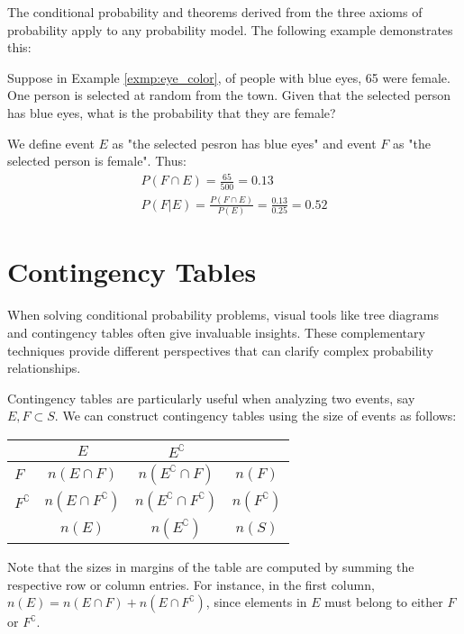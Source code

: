 The conditional probability and theorems derived from the three axioms of probability apply to any probability model.
The following example demonstrates this:

\begin{exmp}
	Suppose in Example \autoref{exmp:eye_color}, of people with blue eyes, 65 were female.
	One person is selected at random from the town.
	Given that the selected person has blue eyes, what is the probability that they are female?
\end{exmp}
\begin{solution}
	We define event \( E \) as "the selected pesron has blue eyes" and event \( F \) as "the selected person is female".
	Thus:
	\begin{gather*}
		P(F \cap E) = \frac{65}{500} = 0.13\\
		P(F | E) = \frac{P(F \cap E)}{P(E)} = \frac{0.13}{0.25} = 0.52
	\end{gather*}
\end{solution}

\section{Contingency Tables}

When solving conditional probability problems, visual tools like tree diagrams and contingency tables often give invaluable insights.
These complementary techniques provide different perspectives that can clarify complex probability relationships.

Contingency tables are particularly useful when analyzing two events, say \( E, F \subset S \).
We can construct contingency tables using the size of events as follows:
\begin{center}
\begin{tabular}{l|cc|c}
                       & \( E \) & \( E^\complement \) &  \\ \hline
\( F \)                & \( n(E \cap F) \) & \( n(E^\complement \cap F) \) & \( n(F) \) \\ 
\( F^\complement \)    & \( n(E \cap F^\complement) \) & \( n(E^\complement \cap F^\complement) \) & \( n(F^\complement) \) \\ \hline
                       & \( n(E) \) & \( n(E^\complement) \) & \( n(S) \)
\end{tabular}
\end{center}
Note that the sizes in margins of the table are computed by summing the respective row or column entries. 
For instance, in the first column, \( n(E) = n(E \cap F) + n(E \cap F^\complement) \),
since elements in \( E \) must belong to either \( F \) or \( F^\complement \).

